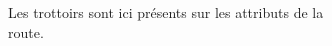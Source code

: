 \begin{figure}
    \centering
    \begin{subfigure}[t]{.32\linewidth}
        \caption{Les trottoirs sont ici présents sur les attributs  de la route.}
    \end{subfigure}
    \begin{subfigure}[t]{.32\linewidth}

\end{subfigure}
\end{figure}
